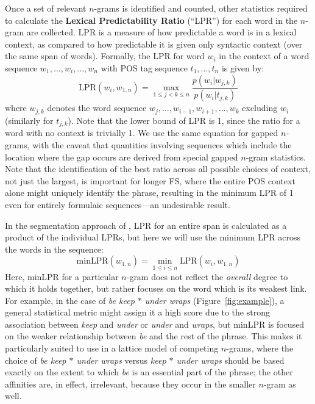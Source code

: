 \documentclass[11pt,letterpaper]{article}
\newcommand{\gap}{$*$\xspace}
\newcommand{\ex}[1]{\textit{#1}\xspace}
\newcommand{\termdef}[1]{\textbf{#1}\xspace}
\newcommand{\LPR}{\ensuremath{\text{LPR}}}
\newcommand{\minLPR}{\ensuremath{\text{minLPR}}}
\newcommand{\figref}[2][]{Figure#1~\ref{#2}\xspace}
\begin{document}
Once a set of relevant $n$-grams is identified and counted, other statistics required to calculate the \termdef{Lexical Predictability Ratio} (``LPR'') for each word in the $n$-gram are collected. LPR is a measure of how predictable a word is in a lexical context, as compared to how predictable it is given only syntactic context (over the same span of words). Formally, the LPR for word $w_i$ in the context of a word sequence $w_1,..., w_i, ..., w_{n}$ with POS tag sequence $t_1, ..., t_{n}$ is given by:
\begin{displaymath}
\LPR(w_i,w_{1,n}) = \max_{1 \leq j < k \leq n }{\frac{p(w_i|w_{j,k})}{p(w_i|t_{j,k})}}
\end{displaymath}
where $w_{j,k}$ denotes the word sequence $w_j,..., w_{i-1}, w_{i+1}, ..., w_{k}$ excluding $w_{i}$ (similarly for $t_{j,k}$). Note that the lower bound of LPR is 1, since the ratio for a word with no context is trivially 1. We use the same equation for gapped $n$-grams, with the caveat that quantities involving sequences which include the location where the gap occurs are derived from special gapped $n$-gram statistics. Note that the identification of the best ratio across all possible choices of context, not just the largest, is important for longer FS, where the entire POS context alone might uniquely identify the phrase, resulting in the minimum LPR of 1 even for entirely formulaic sequences---an undesirable result. 


In the segmentation approach of , LPR for an entire span is calculated as a product of the individual LPRs, but here we will use the minimum LPR across the words in the sequence:
\begin{displaymath}
\minLPR(w_{1,n}) = \min_{1 \leq i \leq n }{\LPR(w_i,w_{1,n})}
\end{displaymath}
Here, minLPR for a particular $n$-gram does not reflect the \emph{overall} degree to which it holds together, but rather focuses on the word which is its weakest link. For example, in the case of \ex{be keep \gap under wraps} (\figref{fig:example}), a general statistical metric might assign it a high score due to the strong association between \ex{keep} and \ex{under} or \ex{under} and \ex{wraps}, but minLPR is focused on the weaker relationship between \ex{be} and the rest of the phrase. This makes it particularly suited to use in a lattice model of competing $n$-grams, where the choice of \ex{be keep \gap under wraps} versus \ex{keep \gap under wraps} should be based exactly on the extent to which \ex{be} is an essential part of the phrase; the other affinities are, in effect, irrelevant, because they occur in the smaller $n$-gram as well.  
\end{document}
